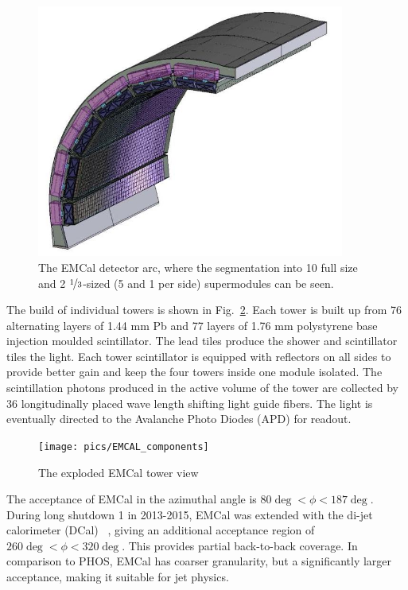 \begin{figure}[htb]
\centering
\includegraphics[width=0.9\textwidth]{figures/fullemcal}
\caption{The EMCal detector arc, where the segmentation into 10 full size and 2 $\nicefrac{1}{3}$-sized (5 and 1 per side) supermodules can be seen.}
\label{fig:emcal}
\end{figure}

The build of individual towers is shown in Fig.~\ref{fig:emcaltower}. Each tower is built up from 76 alternating layers of 1.44 \unit{mm} Pb and 77 layers of 1.76 \unit{mm} polystyrene base injection moulded scintillator. The lead tiles produce the shower and scintillator tiles the light. Each tower scintillator is equipped with reflectors on all sides to provide better gain and keep the four towers inside one module isolated. The scintillation photons produced in the active volume of the tower are collected by 36 longitudinally placed wave length shifting light guide fibers. The light is eventually directed to the Avalanche Photo Diodes (APD) for readout. 


\begin{figure}[htb]
\texttt{[image: pics/EMCAL\_components]}
\caption{The exploded EMCal tower view}
\label{fig:emcaltower}
\end{figure}


The acceptance of EMCal in the azimuthal angle is $ 80\deg < \phi < 187 \deg$. During long shutdown 1 in 2013-2015, EMCal was extended with the di-jet calorimeter (DCal) ~\cite{DCAL}, giving an additional acceptance region of $ 260\deg < \phi < 320 \deg$. This provides partial back-to-back coverage. In comparison to PHOS, EMCal has coarser granularity, but a significantly larger acceptance, making it suitable for jet physics.

